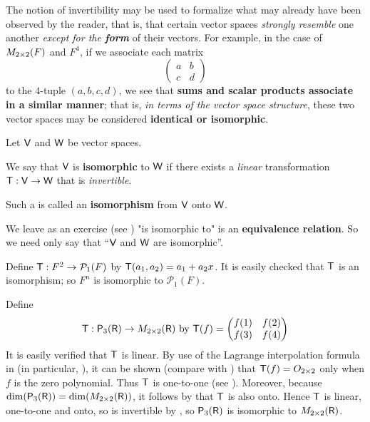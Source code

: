 \begin{remark} \label{remark 2.4.2}
The notion of invertibility may be used to formalize what may already have been observed by the reader, that is,
that certain vector spaces \emph{strongly resemble} one another \emph{except for the \textbf{form}} of their vectors.
For example, in the case of \(M_{2 \times 2}(F)\) and \(F^4\), if we associate each matrix
\[
    \begin{pmatrix} a & b \\ c & d \end{pmatrix}
\]
to the \(4\)-tuple \((a, b, c, d)\), we see that \textbf{sums and scalar products associate in a similar manner};
that is, \emph{in terms of the vector space structure}, these two
vector spaces may be considered \textbf{identical or isomorphic}.
\end{remark}

\begin{definition} \label{def 2.14}
Let \(\textsf{V}\) and \(\textsf{W}\) be vector spaces.

 We say that \(\textsf{V}\) is \textbf{isomorphic} to \(\textsf{W}\) if there exists a \emph{linear} transformation \(\textsf{T} : \textsf{V} \to \textsf{W}\) that is \emph{invertible}.

 Such a \LTRAN{} is called an \textbf{isomorphism} from \(\textsf{V}\) onto \(\textsf{W}\).
\end{definition}

\begin{remark} \label{remark 2.4.3}
We leave as an exercise (see ) "is isomorphic to" is an \textbf{equivalence relation}.
So we need only say that ``\(\textsf{V}\) and \(\textsf{W}\) are isomorphic''.
\end{remark}

\begin{example} \label{example 2.4.4}
Define \(\textsf{T} : F^2 \to \mathcal{P}_1(F)\) by \(\textsf{T}(a_1, a_2) = a_1 + a_2x\).
It is easily checked that \(\textsf{T}\) is an isomorphism;
so \(F^n\) is isomorphic to \(\mathcal{P}_1(F)\).
\end{example}

\begin{example} \label{example 2.4.5}
Define
\[
    \textsf{T} : \textsf{P}_3(\textsf{R}) \to M_{2 \times 2}(\textsf{R}) \text{ by }
    \textsf{T}(f) = \begin{pmatrix} f(1) & f(2) \\ f(3) & f(4) \end{pmatrix}
\]
It is easily verified that \(\textsf{T}\) is linear.
By use of the Lagrange interpolation formula in (in particular, ), it can be shown (compare with ) that \(\textsf{T}(f) = O_{2 \times 2}\) only when \(f\) is the zero polynomial.
Thus \(\textsf{T}\) is one-to-one (see ).
Moreover, because \(\dim(\textsf{P}_3(\textsf{R})) = \dim(M_{2 \times 2}(\textsf{R}))\), it follows by  that \(\textsf{T}\) is also onto.
Hence \(\textsf{T}\) is linear, one-to-one and onto, so is invertible by , so \(\textsf{P}_3(\textsf{R})\) is isomorphic to \(M_{2 \times 2}(\textsf{R})\).
\end{example}

